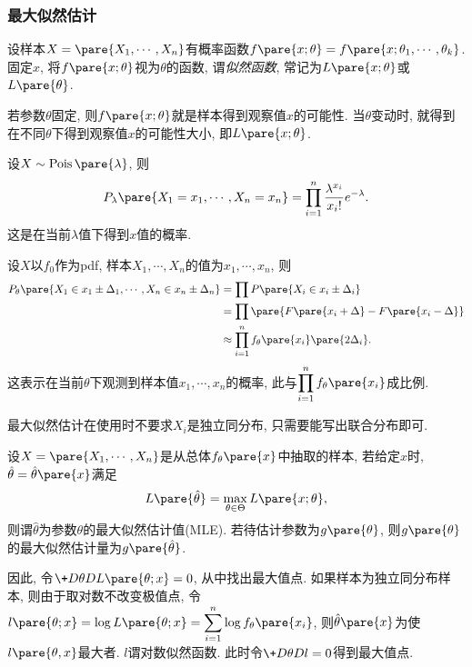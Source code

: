\documentclass{ctexart}
\DeclareMathOperator{\Poisson}{Pois}
\begin{document}

\subsubsection{最大似然估计} %
\label{ssub:最大似然估计}

设样本$X = \pare{X_1,\cdots,X_n}$有概率函数$f\pare{x;\theta} = f\pare{x;\theta_1,\cdots,\theta_k}$. 固定$x$, 将$f\pare{x;\theta}$视为$\theta$的函数, 谓\emph{似然函数}, 常记为$L\pare{x;\theta}$或$L\pare{\theta}$.
\par
若参数$\theta$固定, 则$f\pare{x;\theta}$就是样本得到观察值$x$的可能性. 当$\theta$变动时, 就得到在不同$\theta$下得到观察值$x$的可能性大小, 即$L\pare{x;\theta}$.
\begin{ex}
    设$X\sim \Poisson \pare{\lambda}$, 则
    \[ P_\lambda \pare{X_1 = x_1,\cdots, X_n = x_n} = \prod_{i=1}^n \frac{\lambda^{x_i}}{x_i!}e^{-\lambda}. \]
    这是在当前$\lambda$值下得到$x$值的概率.
\end{ex}
    \begin{ex}
        设$X$以$f_0$作为pdf, 样本$X_1,\cdots,X_n$的值为$x_1,\cdots,x_n$, 则
        \begin{align*}
            P_\theta\pare{X_1 \in x_1\pm \Delta_1,\cdots,X_n\in x_n\pm\Delta_n} &= \prod P\pare{X_i \in x_i \pm \Delta_i} \\&= \prod \pare{F\pare{x_i + \Delta} - F\pare{x_i - \Delta}} \\&\approx \prod_{i=1}^n f_\theta\pare{x_i}\pare{2\Delta_i}. 
        \end{align*}
        这表示在当前$\theta$下观测到样本值$x_1,\cdots,x_n$的概率, 此与$\displaystyle \prod_{i=1}^n f_\theta\pare{x_i}$成比例.
    \end{ex}
最大似然估计在使用时不要求$X_i$是独立同分布, 只需要能写出联合分布即可.
\par
设$X = \pare{X_1,\cdots,X_n}$是从总体$f_\theta\pare{x}$中抽取的样本, 若给定$x$时, $\hat\theta = \hat\theta\pare{x}$满足
\[ L\pare{\hat{\theta}} = \max_{\theta\in\Theta} L\pare{x;\theta}, \]
则谓$\hat\theta$为参数$\theta$的最大似然估计值(MLE). 若待估计参数为$g\pare{\theta}$, 则$g\pare{\theta}$的最大似然估计量为$g\pare{\hat\theta}$.
\par
因此, 令$\displaystyle \+D\theta D{L\pare{\theta; x}} = 0$, 从中找出最大值点. 如果样本为独立同分布样本, 则由于取对数不改变极值点, 令$l\pare{\theta; x} = \log L\pare{\theta; x} = \displaystyle \sum_{i=1}^n \log f_\theta\pare{x_i}$, 则$\hat\theta\pare{x}$为使$l\pare{\theta,x}$最大者. $l$谓对数似然函数. 此时令$\displaystyle \+D\theta Dl = 0$得到最大值点.
\end{document}
